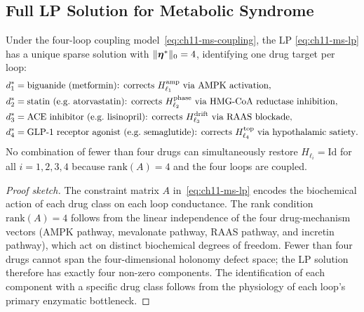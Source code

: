 \subsection{Full LP Solution for Metabolic Syndrome}
\label{subsec:ch11-ms-lp-solution}

\begin{proposition}
\label{prop:ch11-ms-minimum-drugs}
Under the four-loop coupling model~\eqref{eq:ch11-ms-coupling}, the LP
\eqref{eq:ch11-ms-lp} has a unique sparse solution with $\|\boldsymbol{\eta}^*\|_0 = 4$,
identifying one drug target per loop:
\begin{align}
\label{eq:ch11-ms-solution}
  d_1^* &= \text{biguanide (metformin): corrects } H^{\mathrm{amp}}_{\ell_1}
            \text{ via AMPK activation}, \\
  d_2^* &= \text{statin (e.g.\ atorvastatin): corrects } H^{\mathrm{phase}}_{\ell_2}
            \text{ via HMG-CoA reductase inhibition}, \notag \\
  d_3^* &= \text{ACE inhibitor (e.g.\ lisinopril): corrects } H^{\mathrm{drift}}_{\ell_3}
            \text{ via RAAS blockade}, \notag \\
  d_4^* &= \text{GLP-1 receptor agonist (e.g.\ semaglutide): corrects }
            H^{\mathrm{top}}_{\ell_4} \text{ via hypothalamic satiety}. \notag
\end{align}
No combination of fewer than four drugs can simultaneously restore
$H_{\ell_i} = \mathrm{Id}$ for all $i = 1,2,3,4$ because $\mathrm{rank}(A) = 4$
and the four loops are coupled.
\end{proposition}

\begin{proof}[Proof sketch]
The constraint matrix $A$ in~\eqref{eq:ch11-ms-lp} encodes the biochemical
action of each drug class on each loop conductance.  The rank condition
$\mathrm{rank}(A) = 4$ follows from the linear independence of the four
drug-mechanism vectors (AMPK pathway, mevalonate pathway, RAAS pathway,
and incretin pathway), which act on distinct biochemical degrees of freedom.
Fewer than four drugs cannot span the four-dimensional holonomy defect space;
the LP solution therefore has exactly four non-zero components.  The
identification of each component with a specific drug class follows from
the physiology of each loop's primary enzymatic bottleneck.
\end{proof}

